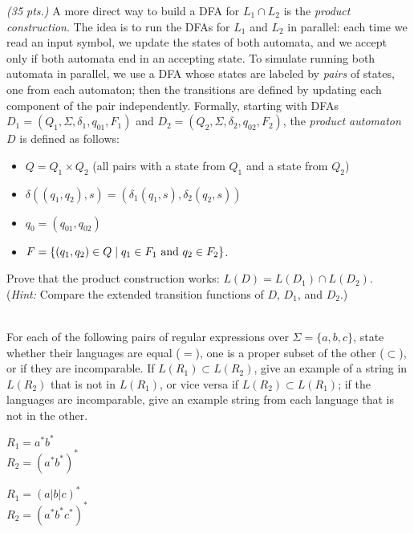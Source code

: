 \documentclass[11pt]{article}
\begin{document}
\begin{qunlist}
\begin{qparts}
\item \emph{(35 pts.)}
A more direct way to build a DFA for $L_1 \cap L_2$ is the \emph{product construction}.
The idea is to run the DFAs for $L_1$ and $L_2$ in parallel: each time we read an input symbol, we update the states of both automata, and we accept only if both automata end in an accepting state.
To simulate running both automata in parallel, we use a DFA whose states are labeled by \emph{pairs} of states, one from each automaton; then the transitions are defined by updating each component of the pair independently.
Formally, starting with DFAs $D_1 = (Q_1, \Sigma, \delta_1, q_{01}, F_1)$ and $D_2 = (Q_2, \Sigma, \delta_2, q_{02}, F_2)$, the \emph{product automaton} $D$ is defined as follows:
\begin{itemize}
\item $Q = Q_1 \times Q_2$ \quad (all pairs with a state from $Q_1$ and a state from $Q_2$)
\item $\delta((q_1, q_2), s) = (\delta_1(q_1, s), \delta_2(q_2, s))$
\item $q_0 = (q_{01}, q_{02})$
\item $F = \{ (q_1, q_2) \in Q \;|\; q_1 \in F_1 \text{ and } q_2 \in F_2 \}$.
\end{itemize}

Prove that the product construction works: $L(D) = L(D_1) \cap L(D_2)$.\\
(\emph{Hint:} Compare the extended transition functions of $D$, $D_1$, and $D_2$.)
\end{qparts}

\newpage


\\
For each of the following pairs of regular expressions over $\Sigma = \{a, b, c\}$, state whether their languages are equal ($=$), one is a proper subset of the other ($\subset$), or if they are incomparable.
If $L(R_1) \subset L(R_2)$, give an example of a string in $L(R_2)$ that is not in $L(R_1)$, or vice versa if $L(R_2) \subset L(R_1)$; if the languages are incomparable, give an example string from each language that is not in the other.

\begin{qparts}
\item
$R_1 = a^* b^*$ \\
$R_2 = (a^* b^*)^*$

\item
$R_1 = (a | b | c)^*$ \\
$R_2 = (a^* b^* c^*)^*$


\end{qparts}
\end{qunlist}
\end{document}
